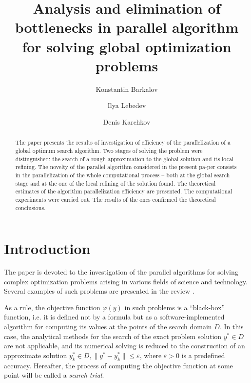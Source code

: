 \documentclass[runningheads]{llncs}
\begin{document}
%
\title{Analysis and elimination of bottlenecks in parallel algorithm for solving global optimization problems}
%
%
\author{
Konstantin Barkalov  \and
Ilya Lebedev  \and
Denis Karchkov 
}
%
%

%
\maketitle              %
%
\begin{abstract}
The paper presents the results of investigation of efficiency of the parallelization of a global optimum search algorithm. Two stages of solving the problem were distinguished: the search of a rough approximation to the global solution and its local refining. The novelty of the parallel algorithm considered in the present pa-per consists in the parallelization of the whole computational process -- both at the global search stage and at the one of the local refining of the solution found. The theoretical estimates of the algorithm parallelization efficiency are presented. The computational experiments were carried out. The results of the ones confirmed the theoretical conclusions.

\end{abstract}
%
%
%
\section{Introduction}

The paper is devoted to the investigation of the parallel algorithms for solving complex optimization problems arising in various fields of science and technology. Several examples of such problems are presented in the review \cite{Pinter2006}.

As a rule, the objective function $\varphi(y)$ in such problems is a ``black-box'' function, i.e. it is defined not by a formula but as a software-implemented algorithm for computing its values at the points of the search domain $D$. In this case, the analytical methods for the search of the exact problem solution $y^{*}  \in D$ are not applicable, and its numerical solving is reduced to the construction of an approximate solution $y_k^* \in D, \|y^{*} - y_k^*\| \leq \varepsilon$, where $\varepsilon > 0$ is a predefined accuracy. Hereafter, the process of computing the objective function at some point will be called a \textit{search trial}.
\end{document}
